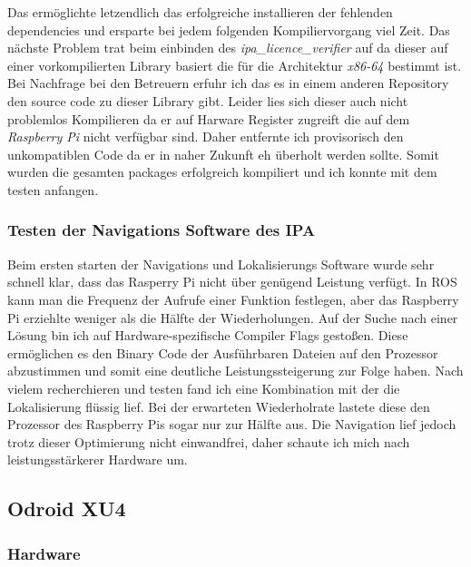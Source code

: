 Das ermöglichte letzendlich das erfolgreiche installieren der fehlenden \Glspl{dependencie} und ersparte bei jedem folgenden Kompiliervorgang viel Zeit.
Das nächste Problem trat beim einbinden des \emph{ipa\_licence\_verifier} auf da dieser auf einer vorkompilierten Library basiert die für die Architektur \emph{x86-64} bestimmt ist. Bei Nachfrage bei den Betreuern erfuhr ich das es in einem anderen Repository den \Gls{source code} zu dieser Library gibt. Leider lies sich dieser auch nicht problemlos Kompilieren da er auf Harware Register zugreift die auf dem \emph{Raspberry Pi} nicht verfügbar sind. 
Daher entfernte ich provisorisch den unkompatiblen Code da er in naher Zukunft eh überholt werden sollte.
Somit wurden die gesamten \Glspl{package} erfolgreich kompiliert und ich konnte mit dem testen anfangen.

\subsubsection{Testen der Navigations Software des IPA}

Beim ersten starten der Navigations und Lokalisierungs Software wurde sehr schnell klar, dass das Rasperry Pi nicht über genügend Leistung verfügt.
In ROS kann man die Frequenz der Aufrufe einer Funktion festlegen, aber das Raspberry Pi erziehlte weniger als die Hälfte der Wiederholungen.
Auf der Suche nach einer Lösung bin ich auf Hardware-spezifische Compiler Flags gestoßen. Diese ermöglichen es den Binary Code der Ausführbaren Dateien auf den Prozessor abzustimmen und somit eine deutliche Leistungssteigerung zur Folge haben.
Nach vielem recherchieren und testen fand ich eine Kombination mit der die Lokalisierung flüssig lief. Bei der erwarteten Wiederholrate lastete diese den Prozessor des Raspberry Pis sogar nur zur Hälfte aus. Die Navigation lief jedoch trotz dieser Optimierung nicht einwandfrei, daher schaute ich mich nach leistungsstärkerer Hardware um.

\subsection{Odroid XU4}

\subsubsection{Hardware}

